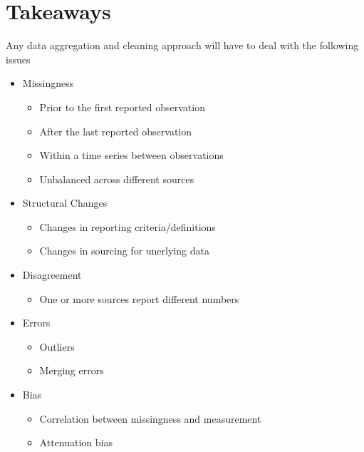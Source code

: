 \documentclass[
]{book}
\providecommand{\tightlist}{%
  \setlength{\itemsep}{0pt}\setlength{\parskip}{0pt}}
\begin{document}
\hypertarget{htmlwidget-2a46d5fb86d8a88a1936}{}

\hypertarget{takeaways}{%
\section{Takeaways}\label{takeaways}}

Any data aggregation and cleaning approach will have to deal with the following issues

\begin{itemize}
\tightlist
\item
  Missingness

  \begin{itemize}
  \tightlist
  \item
    Prior to the first reported observation
  \item
    After the last reported observation
  \item
    Within a time series between observations
  \item
    Unbalanced across different sources
  \end{itemize}
\item
  Structural Changes

  \begin{itemize}
  \tightlist
  \item
    Changes in reporting criteria/definitions
  \item
    Changes in sourcing for unerlying data
  \end{itemize}
\item
  Disagreement

  \begin{itemize}
  \tightlist
  \item
    One or more sources report different numbers
  \end{itemize}
\item
  Errors

  \begin{itemize}
  \tightlist
  \item
    Outliers
  \item
    Merging errors
  \end{itemize}
\item
  Bias

  \begin{itemize}
  \tightlist
  \item
    Correlation between missingness and measurement
  \item
    Attenuation bias
  \end{itemize}
\end{itemize}
\end{document}
